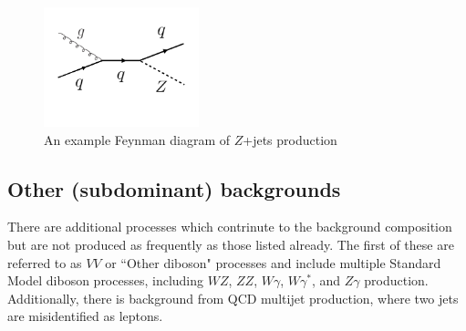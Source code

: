 \begin{figure}[h!]
  \centering
  \captionsetup{justification=centering}

  \includegraphics[width=0.4\textwidth]{figures/Feyn_Zjets}
  \caption{An example Feynman diagram of $Z$+jets production}
  \label{fig:Zdiagram}
\end{figure}

\subsection{Other (subdominant) backgrounds}

There are additional processes which contrinute to the background composition but are not produced as frequently as those listed already. The first of these are referred to as $VV$ or ``Other diboson" processes and include multiple Standard Model diboson processes, including $WZ$, $ZZ$, $W\gamma$, $W\gamma^{*}$, and $Z\gamma$ production. Additionally, there is background from QCD multijet production, where two jets are misidentified as leptons. 

